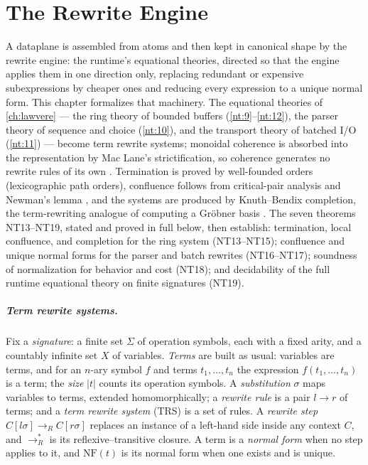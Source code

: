 \chapter{The Rewrite Engine}\label{ch:rewrite}

A dataplane is assembled from atoms and then kept in canonical shape by the
rewrite engine: the runtime's equational theories, directed so that the
engine applies them in one direction only, replacing redundant or expensive
subexpressions by cheaper ones and reducing every expression to a unique
normal form. This chapter formalizes that machinery. The equational theories
of \autoref{ch:lawvere} --- the ring theory of bounded buffers
(\autoref{nt:9}--\autoref{nt:12}), the parser theory of sequence and choice
(\autoref{nt:10}), and the transport theory of batched I/O
(\autoref{nt:11}) --- become term rewrite systems; monoidal coherence is
absorbed into the representation by Mac Lane's strictification, so coherence
generates no rewrite rules of its own \cite{maclane}. Termination is proved
by well-founded orders (lexicographic path orders), confluence follows from
critical-pair analysis and Newman's lemma \cite{newman}, and the systems are
produced by Knuth--Bendix completion, the term-rewriting analogue of
computing a Gr\"obner basis \cite{knuthbendix}. The seven theorems
NT13--NT19, stated and proved in full below, then establish: termination,
local confluence, and completion for the ring system (NT13--NT15);
confluence and unique normal forms for the parser and batch rewrites
(NT16--NT17); soundness of normalization for behavior and cost (NT18); and
decidability of the full runtime equational theory on finite signatures
(NT19).

\paragraph{Term rewrite systems.}
Fix a \emph{signature}: a finite set $\Sigma$ of operation symbols, each with
a fixed arity, and a countably infinite set $X$ of variables. \emph{Terms}
are built as usual: variables are terms, and for an $n$-ary symbol $f$ and
terms $t_1, \ldots, t_n$ the expression $f(t_1, \ldots, t_n)$ is a term; the
\emph{size} $|t|$ counts its operation symbols. A \emph{substitution}
$\sigma$ maps variables to terms, extended homomorphically; a \emph{rewrite
rule} is a pair $l \to r$ of terms; and a \emph{term rewrite system} (TRS)
is a set of rules. A \emph{rewrite step} $C[l\sigma] \to_R C[r\sigma]$
replaces an instance of a left-hand side inside any context $C$, and
$\to_R^{*}$ is its reflexive--transitive closure. A term is a \emph{normal
form} when no step applies to it, and $\mathrm{NF}(t)$ is its normal form
when one exists and is unique.

